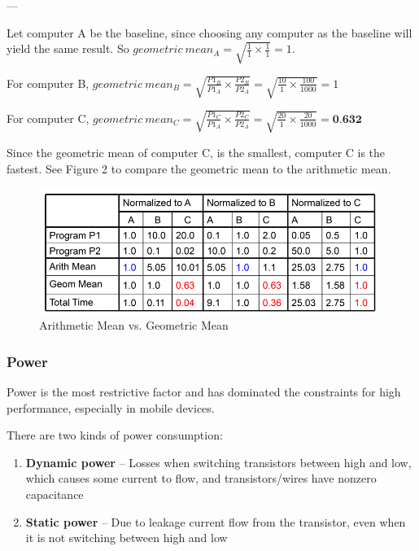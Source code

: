 \documentclass{article}
\begin{document}
--- 

Let computer A be the baseline, since choosing any computer as the baseline will yield the same result. So $geometric\ mean_A = \sqrt{\frac{1}{1} \times \frac{1}{1}} = 1$. 

For computer B, $geometric\ mean_B = \sqrt{\frac{P1_B}{P1_A} \times \frac{P2_B}{P2_A}} =  \sqrt{\frac{10}{1} \times \frac{100}{1000}} = 1$


For computer C, $geometric\ mean_C = \sqrt{\frac{P1_C}{P1_A} \times \frac{P2_C}{P2_A}} =  \sqrt{\frac{20}{1} \times \frac{20}{1000}} = \textbf{0.632}$

Since the geometric mean of computer C, is the smallest, computer C is the fastest. See Figure 2 to compare the geometric mean to the arithmetic mean.

\begin{figure}[ht!]
\centering
\includegraphics[width=110mm]{img/ArithGeo.png}
\caption{Arithmetic Mean vs. Geometric Mean}
\end{figure}

\subsubsection{Power}

Power is the most restrictive factor and has dominated the constraints for high performance, especially in mobile devices. 

There are two kinds of power consumption:

\begin{enumerate}
\item \textbf{Dynamic power} -- Losses when switching transistors between high and low, which causes some current to flow, and transistors/wires have nonzero capacitance

\item \textbf{Static power} -- Due to leakage current flow from the transistor, even when it is not switching between high and low

\end{enumerate}
\end{document}
